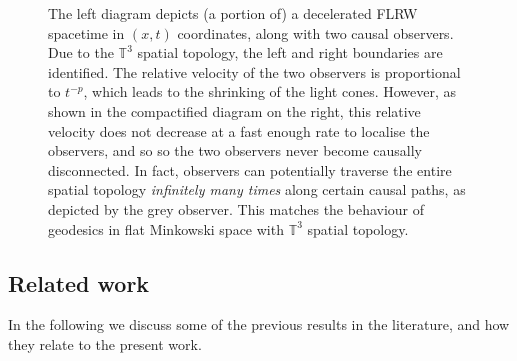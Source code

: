 \documentclass{article}
\newcommand{\TT}{\mathbb{T}}
\begin{document}
\begin{figure}
    \caption{\small{The left diagram depicts (a portion of) a decelerated FLRW spacetime in $(x,t)$ coordinates, along with two causal observers. Due to the $\TT^3$ spatial topology, the left and right boundaries are identified. The relative velocity of the two observers is proportional to $t^{-p}$, which leads to the shrinking of the light cones. However, as shown in the compactified diagram on the right, this relative velocity does not decrease at a fast enough rate to localise the observers, and so so the two observers never become causally disconnected. In fact, observers can potentially traverse the entire spatial topology \emph{infinitely many times} along certain causal paths, as depicted by the grey observer. This matches the behaviour of geodesics in flat Minkowski space with $\TT^3$ spatial topology.}}
\end{figure}
\subsection{Related work}\label{sec:intro.subsec:related}
In the following we discuss some of the previous results in the literature, and how they relate to the present work.
\end{document}
